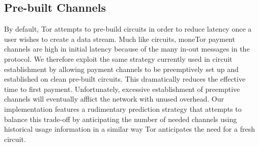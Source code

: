 
%
%

\subsection{Pre-built Channels}
By default, Tor attempts to pre-build circuits in order to reduce latency once a
user wishes to create a data stream. Much like circuits, moneTor payment
channels are high in initial latency because of the many in-out messages in the protocol. We therefore exploit the same strategy currently used in circuit establishment by
allowing payment channels to be preemptively set up and established on clean
pre-built circuits. This dramatically reduces the effective time to first
payment. Unfortunately, excessive establishment of preemptive channels will
eventually afflict the network with unused overhead. Our implementation features
a rudimentary prediction strategy that attempts to balance this trade-off by
anticipating the number of needed channels using historical usage
information in a similar way Tor anticipates the need for a fresh circuit.

